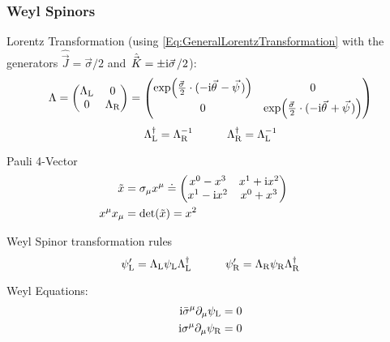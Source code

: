 		\subsubsection{Weyl Spinors}
			\noindent
			Lorentz Transformation (using \ref{Eq:GeneralLorentzTransformation} with the generators $\hat{\vec{J}} = \vec{\sigma}/2$ and $\hat{\vec{K}} = \pm \i\vec{\sigma}/2$):
			\begin{equation}
				\Lambda 
				= \mqty(\Lambda_\text{L} & 0 \\ 0 & \Lambda_\text{R})
				= \mqty(
					\exp(\frac{\vec{\sigma}}{2}\cdot(-\i\vec{\theta} - \vec{\psi})) & 0 \\
					0 & \exp(\frac{\vec{\sigma}}{2}\cdot(-\i\vec{\theta} + \vec{\psi})) 					
						)
					\end{equation}
			\begin{equation}
				\Lambda_\text{L}^\dagger = \Lambda_\text{R}^{-1} \hspace{30pt} \Lambda_\text{R}^\dagger = \Lambda_\text{L}^{-1}
			\end{equation}

			\noindent
			Pauli 4-Vector
			\begin{equation}
				\begin{aligned}
					\tilde{x} &= \sigma_\mu x^\mu \doteq \mqty(
						x^0 - x^3 & x^1 + \i x^2 \\
						x^1 - \i x^2 & x^0 + x^3 \\
						) \hsp \\
					x^\mu x_\mu &= \det(\tilde{x}) = x^2 \\
				\end{aligned}
			\end{equation}
			
			\noindent
			Weyl Spinor transformation rules
			\begin{equation}
				\psi_\text{L}' = \Lambda_\text{L} \psi_\text{L} \Lambda_\text{L}^\dagger \hspace{30pt}
				\psi_\text{R}' = \Lambda_\text{R} \psi_\text{R} \Lambda_\text{R}^\dagger 
			\end{equation}
			
			\noindent
			Weyl Equations:
			\begin{equation}
				\begin{aligned}
					\mathrm{i} \bar{\sigma}^\mu \partial_\mu \psi_\text{L} &= 0 \\
					\mathrm{i} \sigma^\mu \partial_\mu \psi_\text{R} &= 0 \\
				\end{aligned}
			\end{equation}
			
